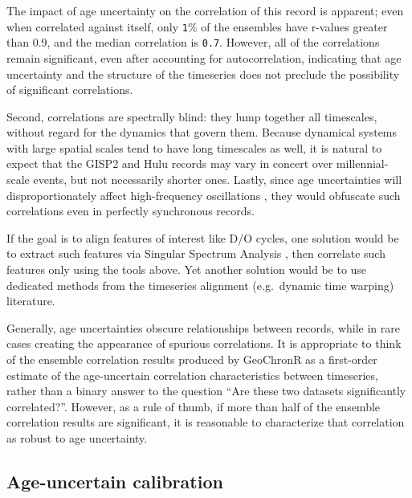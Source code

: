 \documentclass[gchron, manuscript]{copernicus}
\begin{document}
The impact of age uncertainty on the correlation of this record is apparent; even when correlated against itself, only \texttt{1}\% of the ensembles have r-values greater than 0.9, and the median correlation is \texttt{0.7}.
However, all of the correlations remain significant, even after accounting for autocorrelation, indicating that age uncertainty and the structure of the timeseries does not preclude the possibility of significant correlations.

Second, correlations are spectrally blind: they lump together all timescales, without regard for the dynamics that govern them. Because dynamical systems with large spatial scales tend to have long timescales as well, it is natural to expect that the GISP2 and Hulu records may vary in concert over millennial-scale events, but not necessarily shorter ones. Lastly, since age uncertainties will disproportionately affect high-frequency oscillations \citep[e.g.][]{BAM}, they would obfuscate such correlations even in perfectly synchronous records.

If the goal is to align features of interest like D/O cycles, one solution would be to extract such features via Singular Spectrum Analysis \citep{Vautard89, Vautard1992}, then correlate such features only using the tools above. Yet another solution would be to use dedicated methods from the timeseries alignment (e.g.~dynamic time warping) literature.

Generally, age uncertainties obscure relationships between records, while in rare cases creating the appearance of spurious correlations. It is appropriate to think of the ensemble correlation results produced by GeoChronR as a first-order estimate of the age-uncertain correlation characteristics between timeseries, rather than a binary answer to the question ``Are these two datasets significantly correlated?''.
However, as a rule of thumb, if more than half of the ensemble correlation results are significant, it is reasonable to characterize that correlation as robust to age uncertainty.

\subsection{Age-uncertain calibration}
\end{document}
